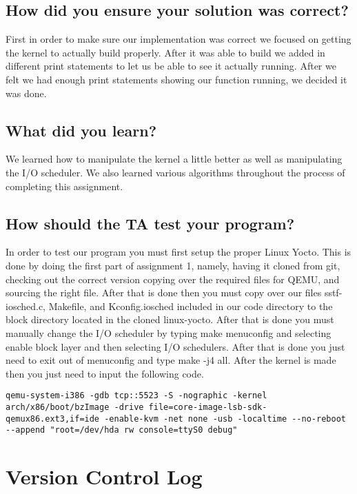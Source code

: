 \documentclass[10pt,letterpaper,onecolumn,draftclsnofoot]{IEEEtran}
\begin{document}
\subsection{How did you ensure your solution was correct?}
First in order to make sure our implementation was correct we focused on getting the kernel to actually build properly. After it was able to build we added in different print statements to let us be able to see it actually running. After we felt we had enough print statements showing our function running, we decided it was done.

\subsection{What did you learn?}
We learned how to manipulate the kernel a little better as well as manipulating the I/O scheduler. We also learned various algorithms throughout the process of completing this assignment.

\subsection{How should the TA test your program?}
In order to test our program you must first setup the proper Linux Yocto. This is done by doing the first part of assignment 1, namely, having it cloned from git, checking out the correct version copying over the required files for QEMU, and sourcing the right file. After that is done then you must copy over our files sstf-iosched.c, Makefile, and Kconfig.iosched included in our code directory to the block directory located in the cloned linux-yocto. After that is done you must manually change the I/O scheduler by typing make menuconfig and selecting enable block layer and then selecting I/O schedulers. After that is done you just need to exit out of menuconfig and type make -j4 all. After the kernel is made then you just need to input the following code.

\begin{lstlisting}
qemu-system-i386 -gdb tcp::5523 -S -nographic -kernel arch/x86/boot/bzImage -drive file=core-image-lsb-sdk-qemux86.ext3,if=ide -enable-kvm -net none -usb -localtime --no-reboot --append "root=/dev/hda rw console=ttyS0 debug"
\end{lstlisting}

\section{Version Control Log}
\end{document}
